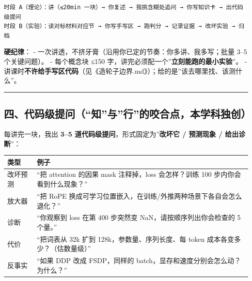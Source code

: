 \documentclass[
  chinese,
  11pt,
]{ctexart}
\newcounter{none} %
\begin{document}
\begin{verbatim}
时段 A（理论）：讲（≤20min 一块）→ 你复述 → 我挑含糊处追问 → 你写知识卡 → 出代码级提问
时段 B（实验）：读对标材料对应节 → 你写手写区 → 跑判分 → 记录证据 → 改坏实验 → 归档
\end{verbatim}

\textbf{硬纪律}： - 一次讲透，不挤牙膏（沿用你已定的节奏：你多讲、我多写；批量 3--5 个关键问题）。 - 每个概念块 ≤150 字，讲完必须配一个''\textbf{立刻能跑的最小实验}''。 - 讲课时\textbf{不许给手写区代码}（见《造轮子边界.md》）；给的是''该去哪里找、该测什么''。

\begin{center}\rule{0.5\linewidth}{0.5pt}\end{center}

\subsection{四、代码级提问（``知''与''行''的咬合点，本学科独创）}\label{ux56dbux4ee3ux7801ux7ea7ux63d0ux95eeux77e5ux4e0eux884cux7684ux54acux5408ux70b9ux672cux5b66ux79d1ux72ecux521b}

每讲完一块，我出 \textbf{3--5 道代码级提问}，形式固定为''\textbf{改坏它 / 预测现象 / 给出诊断}''：

{\def\LTcaptype{none} %
\begin{longtable}[]{@{}
  >{\raggedright\arraybackslash}p{}
  >{\raggedright\arraybackslash}p{}@{}}
\toprule\noalign{}
\begin{minipage}[b]{\linewidth}\raggedright
类型
\end{minipage} & \begin{minipage}[b]{\linewidth}\raggedright
例子
\end{minipage} \\
\midrule\noalign{}
\endhead
\bottomrule\noalign{}
\endlastfoot
改坏预测 & ``把 attention 的因果 mask 注释掉，loss 会怎样？训练 100 步内你会看到什么现象？'' \\
放大器 & ``把 RoPE 换成可学习位置嵌入，在训练/外推两种场景下各自会怎么退化？'' \\
诊断 & ``你观察到 loss 在第 400 步突然变 NaN，请按顺序列出你会检查的 5 个量。'' \\
代价 & ``把词表从 32k 扩到 128k，参数量、序列长度、每 token 成本各变多少？（估数量级）'' \\
反事实 & ``如果 DDP 改成 FSDP，同样的 batch，显存和速度分别会怎么动？为什么？'' \\
\end{longtable}
}
\end{document}

